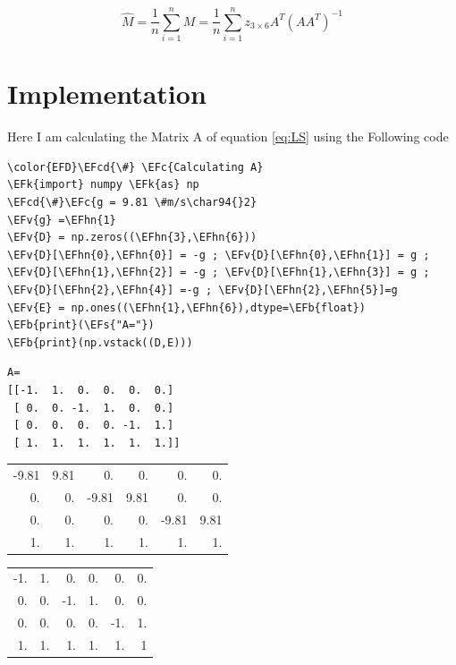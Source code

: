 \documentclass[11pt]{article}
\newcommand{\EFc}[1]{\textcolor{EFc}{#1}} %
\newcommand{\EFcd}[1]{\textcolor{EFcd}{#1}} %
\newcommand{\EFs}[1]{\textcolor{EFs}{#1}} %
\newcommand{\EFk}[1]{\textcolor{EFk}{#1}} %
\newcommand{\EFb}[1]{\textcolor{EFb}{#1}} %
\newcommand{\EFv}[1]{\textcolor{EFv}{#1}} %
\newcommand{\EFhn}[1]{\textcolor{EFhn}{#1}} %
\begin{document}
\begin{equation}\label{eq:LS2}
\hat{M}=\frac{1}{n}\sum_{i=1}^{n}M = \frac{1}{n}\sum_{i=1}^{n}z_{3\times 6}A^{T}(AA^{T})^{-1}
\end{equation}
\section{Implementation}
\label{sec:orgbb5d0c7}
Here I am calculating the Matrix A of equation \ref{eq:LS} using the Following code 
\begin{Code}
\begin{Verbatim}
\color{EFD}\EFcd{\#} \EFc{Calculating A} 
\EFk{import} numpy \EFk{as} np
\EFcd{\#}\EFc{g = 9.81 \#m/s\char94{}2}
\EFv{g} =\EFhn{1} 
\EFv{D} = np.zeros((\EFhn{3},\EFhn{6}))
\EFv{D}[\EFhn{0},\EFhn{0}] = -g ; \EFv{D}[\EFhn{0},\EFhn{1}] = g ; \EFv{D}[\EFhn{1},\EFhn{2}] = -g ; \EFv{D}[\EFhn{1},\EFhn{3}] = g ; \EFv{D}[\EFhn{2},\EFhn{4}] =-g ; \EFv{D}[\EFhn{2},\EFhn{5}]=g
\EFv{E} = np.ones((\EFhn{1},\EFhn{6}),dtype=\EFb{float})
\EFb{print}(\EFs{"A="})
\EFb{print}(np.vstack((D,E)))
\end{Verbatim}
\end{Code}

\label{}
\begin{verbatim}
A=
[[-1.  1.  0.  0.  0.  0.]
 [ 0.  0. -1.  1.  0.  0.]
 [ 0.  0.  0.  0. -1.  1.]
 [ 1.  1.  1.  1.  1.  1.]]
\end{verbatim}


\begin{table}[htbp]
\label{A}
\centering
\begin{tabular}{rrrrrr}
-9.81 & 9.81 & 0. & 0. & 0. & 0.\\
0. & 0. & -9.81 & 9.81 & 0. & 0.\\
0. & 0. & 0. & 0. & -9.81 & 9.81\\
1. & 1. & 1. & 1. & 1. & 1.\\
\end{tabular}
\end{table}

\begin{table}[htbp]
\label{B}
\centering
\begin{tabular}{rrrrrr}
-1. & 1. & 0. & 0. & 0. & 0.\\
0. & 0. & -1. & 1. & 0. & 0.\\
0. & 0. & 0. & 0. & -1. & 1.\\
1. & 1. & 1. & 1. & 1. & 1\\
\end{tabular}
\end{table}
\end{document}

